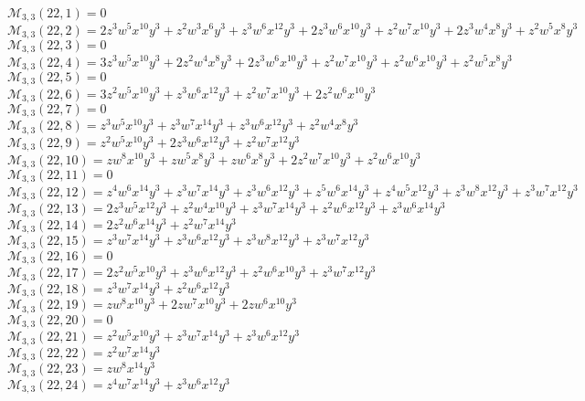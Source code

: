 \documentclass[12pt]{memoireuqam1.3}
\begin{document}
$\mathcal{M}_{3,3}(22,1)=0$\\
$\mathcal{M}_{3,3}(22,2)=2z^3w^5x^{10}y^3+z^2w^3x^6y^3+z^3w^6x^{12}y^3+2z^3w^6x^{10}y^3+z^2w^7x^{10}y^3+2z^3w^4x^8y^3+z^2w^5x^8y^3$\\
$\mathcal{M}_{3,3}(22,3)=0$\\
$\mathcal{M}_{3,3}(22,4)=3z^3w^5x^{10}y^3+2z^2w^4x^8y^3+2z^3w^6x^{10}y^3+z^2w^7x^{10}y^3+z^2w^6x^{10}y^3+z^2w^5x^8y^3$\\
$\mathcal{M}_{3,3}(22,5)=0$\\
$\mathcal{M}_{3,3}(22,6)=3z^2w^5x^{10}y^3+z^3w^6x^{12}y^3+z^2w^7x^{10}y^3+2z^2w^6x^{10}y^3$\\
$\mathcal{M}_{3,3}(22,7)=0$\\
$\mathcal{M}_{3,3}(22,8)=z^3w^5x^{10}y^3+z^3w^7x^{14}y^3+z^3w^6x^{12}y^3+z^2w^4x^8y^3$\\
$\mathcal{M}_{3,3}(22,9)=z^2w^5x^{10}y^3+2z^3w^6x^{12}y^3+z^2w^7x^{12}y^3$\\
$\mathcal{M}_{3,3}(22,10)=zw^8x^{10}y^3+zw^5x^8y^3+zw^6x^8y^3+2z^2w^7x^{10}y^3+z^2w^6x^{10}y^3$\\
$\mathcal{M}_{3,3}(22,11)=0$\\
$\mathcal{M}_{3,3}(22,12)=z^4w^6x^{14}y^3+z^3w^7x^{14}y^3+z^3w^6x^{12}y^3+z^5w^6x^{14}y^3+z^4w^5x^{12}y^3+z^3w^8x^{12}y^3+z^3w^7x^{12}y^3$\\
$\mathcal{M}_{3,3}(22,13)=2z^3w^5x^{12}y^3+z^2w^4x^{10}y^3+z^3w^7x^{14}y^3+z^2w^6x^{12}y^3+z^3w^6x^{14}y^3$\\
$\mathcal{M}_{3,3}(22,14)=2z^2w^6x^{14}y^3+z^2w^7x^{14}y^3$\\
$\mathcal{M}_{3,3}(22,15)=z^3w^7x^{14}y^3+z^3w^6x^{12}y^3+z^3w^8x^{12}y^3+z^3w^7x^{12}y^3$\\
$\mathcal{M}_{3,3}(22,16)=0$\\
$\mathcal{M}_{3,3}(22,17)=2z^2w^5x^{10}y^3+z^3w^6x^{12}y^3+z^2w^6x^{10}y^3+z^3w^7x^{12}y^3$\\
$\mathcal{M}_{3,3}(22,18)=z^3w^7x^{14}y^3+z^2w^6x^{12}y^3$\\
$\mathcal{M}_{3,3}(22,19)=zw^8x^{10}y^3+2zw^7x^{10}y^3+2zw^6x^{10}y^3$\\
$\mathcal{M}_{3,3}(22,20)=0$\\
$\mathcal{M}_{3,3}(22,21)=z^2w^5x^{10}y^3+z^3w^7x^{14}y^3+z^3w^6x^{12}y^3$\\
$\mathcal{M}_{3,3}(22,22)=z^2w^7x^{14}y^3$\\
$\mathcal{M}_{3,3}(22,23)=zw^8x^{14}y^3$\\
$\mathcal{M}_{3,3}(22,24)=z^4w^7x^{14}y^3+z^3w^6x^{12}y^3$\\
\end{document}
